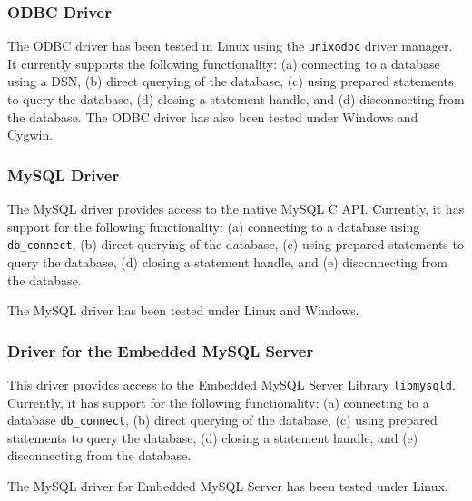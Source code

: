 \subsubsection{ODBC Driver}

The ODBC driver has been tested in Linux using the {\tt unixodbc} driver
manager.  It currently supports the following functionality: (a)
connecting to a database using a DSN, (b) direct querying of the database,
(c) using prepared statements to query the database, (d) closing a
statement handle, and (d) disconnecting from the database.
The ODBC driver has also been tested under Windows and Cygwin.


\subsubsection{MySQL Driver}

The MySQL driver provides access to the native MySQL C API.
Currently, it has support for the following functionality: (a) connecting
to a database using {\tt db\_connect}, (b) direct querying of
the database, (c) using prepared statements to query the database, (d) closing a
statement handle, and (e) disconnecting from the database.

The MySQL driver has been tested under Linux and Windows.


\subsubsection{Driver for the Embedded MySQL Server}

This driver provides access to the Embedded MySQL Server Library {\tt libmysqld}. Currently, it has support for the following functionality: (a) connecting
to a database {\tt db\_connect}, (b) direct querying of
the database, (c) using prepared statements to query the database, (d) closing a
statement handle, and (e) disconnecting from the database.

The MySQL driver for Embedded MySQL Server has been tested under Linux.

